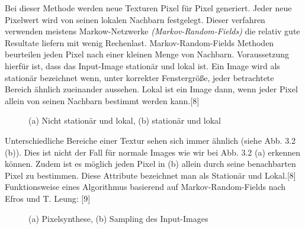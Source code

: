 \documentclass[12pt]{report}
\begin{document}
Bei dieser Methode werden neue Texturen Pixel für Pixel generiert.
Jeder neue Pixelwert wird von seinen lokalen Nachbarn festgelegt.
Dieser verfahren verwenden meistens Markow-Netzwerke \textit{(Markov-Random-Fields)} die relativ gute Resultate liefern mit wenig Rechenlast.
Markov-Random-Fields Methoden beurteilen jeden Pixel nach einer kleinen Menge von Nachbarn.
Voraussetzung hierfür ist, dass das Input-Image stationär und lokal ist.
Ein Image wird als stationär bezeichnet wenn, unter korrekter Fenstergröße,
jeder betrachtete Bereich ähnlich zueinander aussehen.
Lokal ist ein Image dann, wenn jeder Pixel allein von seinen Nachbarn bestimmt werden kann.{[8]}

\begin{figure}[H]
    \centering
    \qquad
    \caption{(a) Nicht stationär und lokal, (b) stationär und lokal}%
\end{figure}

\noindent Unterschiedliche Bereiche einer Textur sehen sich immer ähnlich {(siehe Abb. 3.2 (b))}.
Dies ist nicht der Fall für normale Images wie wir bei Abb. 3.2 {(a)} erkennen können.
Zudem ist es möglich jeden Pixel in {(b)} allein durch seine benachbarten Pixel zu bestimmen.
Diese Attribute bezeichnet man als Stationär und Lokal.{[8]} \\

\noindent Funktionsweise eines Algorithmus basierend auf Markov-Random-Fields nach Efros und T. Leung: {[9]}

\begin{figure}[H]
    \centering
    \qquad
    \caption{(a) Pixelsynthese, (b) Sampling des Input-Images}%
\end{figure}
\end{document}
